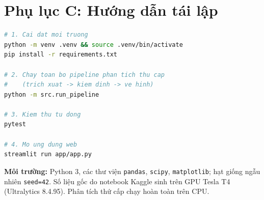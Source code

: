 \section*{Phụ lục C: Hướng dẫn tái lập}
\label{app:repro}

\begin{lstlisting}[language=bash,caption={Các bước tái lập kết quả}]
# 1. Cai dat moi truong
python -m venv .venv && source .venv/bin/activate
pip install -r requirements.txt

# 2. Chay toan bo pipeline phan tich thu cap
#    (trich xuat -> kiem dinh -> ve hinh)
python -m src.run_pipeline

# 3. Kiem thu tu dong
pytest

# 4. Mo ung dung web
streamlit run app/app.py
\end{lstlisting}

\textbf{Môi trường:} Python 3, các thư viện \texttt{pandas}, \texttt{scipy}, \texttt{matplotlib};
hạt giống ngẫu nhiên \texttt{seed=42}. Số liệu gốc do notebook Kaggle sinh trên GPU Tesla T4
(Ultralytics 8.4.95). Phân tích thứ cấp chạy hoàn toàn trên CPU.
